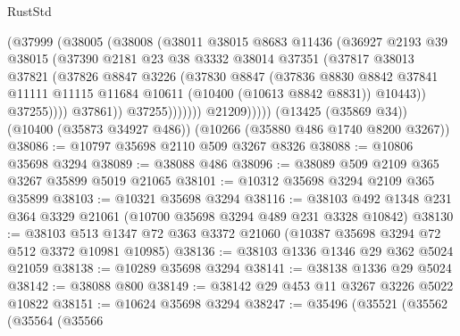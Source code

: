 \begin{lexlean}{RustStd}
\begin{coremodule}
{\begin{coremodule}
{{{{{{{{{{{{{{{{{{{{{{{{{                        (@37999
                          (@38005
                            (@38008
                              (@38011
                                @38015
                                @8683
                                @11436
                                (@36927
                                  @2193
                                  @39
                                  @38015
                                  (@37390
                                    @2181
                                    @23
                                    @38
                                    @3332
                                    @38014
                                    @37351
                                    (@37817
                                      @38013
                                      @37821
                                      (@37826
                                        @8847
                                        @3226
                                        (@37830
                                          @8847
                                          (@37836
                                            @8830
                                            @8842
                                            @37841
                                            @11111
                                            @11115
                                            @11684
                                            @10611
                                            (@10400 (@10613 @8842 @8831))
                                            @10443))
                                        @37255))))
                                @37861))
                            @37255)))))))
              @21209)))))
    (@13425 (@35869 @34))
    (@10400 (@35873 @34927 @486))
    (@10266 (@35880 @486 @1740 @8200 @3267))
@38086 := @10797 @35698 @2110 @509 @3267 @8326
@38088 := @10806 @35698 @3294
@38089 := @38088 @486
@38096 := @38089 @509 @2109 @365 @3267 @35899 @5019 @21065
@38101 := @10312 @35698 @3294 @2109 @365 @35899
@38103 := @10321 @35698 @3294
@38116 := @38103 @492 @1348 @231 @364 @3329 @21061 (@10700 @35698 @3294 @489 @231 @3328 @10842)
@38130 := @38103 @513 @1347 @72 @363 @3372 @21060 (@10387 @35698 @3294 @72 @512 @3372 @10981 @10985)
@38136 := @38103 @1336 @1346 @29 @362 @5024 @21059
@38138 := @10289 @35698 @3294
@38141 := @38138 @1336 @29 @5024
@38142 := @38088 @800
@38149 := @38142 @29 @453 @11 @3267 @3226 @5022 @10822
@38151 := @10624 @35698 @3294
@38247 := @35496
    (@35521
      (@35562
        (@35564
          (@35566
}}}}}}}}}}}}}}}}}}}}}}}}}
\end{coremodule}}
\end{coremodule}
\end{lexlean}
